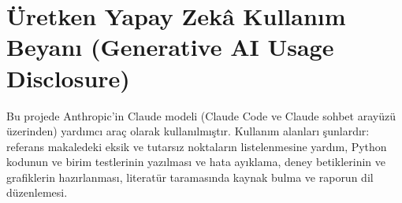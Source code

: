 \documentclass[11pt,a4paper]{article}
\theoremstyle{definition}
\begin{document}
\section*{Üretken Yapay Zekâ Kullanım Beyanı (Generative AI Usage Disclosure)}

Bu projede Anthropic'in Claude modeli (Claude Code ve Claude sohbet arayüzü üzerinden) yardımcı araç olarak kullanılmıştır. Kullanım alanları şunlardır: referans makaledeki eksik ve tutarsız noktaların listelenmesine yardım, Python kodunun ve birim testlerinin yazılması ve hata ayıklama, deney betiklerinin ve grafiklerin hazırlanması, literatür taramasında kaynak bulma ve raporun dil düzenlemesi.



\end{document}
